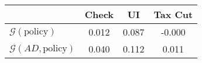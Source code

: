 \begin{tabular}{@{}lccc@{}} 
\toprule 
                          & Check      & UI    & Tax Cut    \\  \midrule 
$\mathcal{G}(\text{policy})$ & 0.012  & 0.087  & -0.000     \\ 
$\mathcal{G}(AD,\text{policy})$ & 0.040  & 0.112  & 0.011     \\ 
\end{tabular}  
